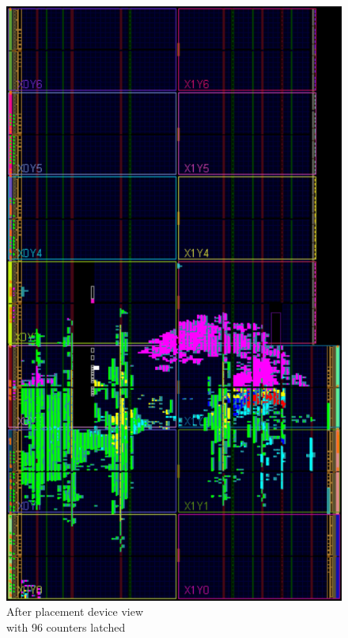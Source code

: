 \begin{figure}[H]
	\centering
	\begin{minipage}{.5\textwidth}
		\centering
		\includegraphics[width=.85\linewidth]{IMG/ch4/routed_colored_counters_clocks}
		\caption{After placement device view\\ with 96 counters latched}
		\label{fig:counters_clocks}
	\end{minipage}%
	\begin{minipage}{.5\textwidth}
		\centering

\end{minipage}
\end{figure}
